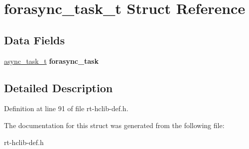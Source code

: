\hypertarget{structforasync__task__t}{\section{forasync\-\_\-task\-\_\-t Struct Reference}
\label{structforasync__task__t}
}
\subsection*{Data Fields}
\begin{DoxyCompactItemize}
\item 
\hypertarget{structforasync__task__t_a4f0dfba839721bb9330589c7e4049371}{\hyperlink{structasync__task__t}{async\-\_\-task\-\_\-t} {\bfseries forasync\-\_\-task}}\label{structforasync__task__t_a4f0dfba839721bb9330589c7e4049371}

\end{DoxyCompactItemize}


\subsection{Detailed Description}


Definition at line 91 of file rt-\/hclib-\/def.\-h.



The documentation for this struct was generated from the following file\-:\begin{DoxyCompactItemize}
\item 
rt-\/hclib-\/def.\-h\end{DoxyCompactItemize}
